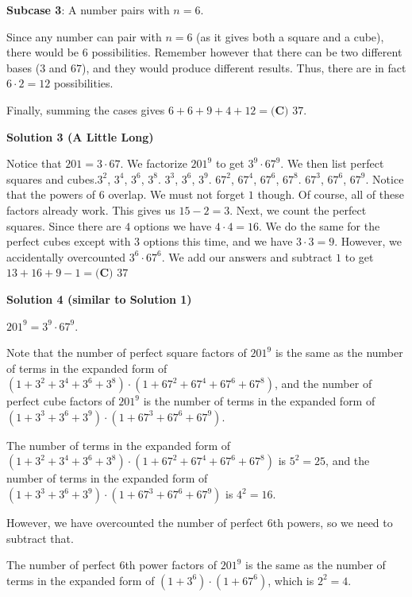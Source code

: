 \begin{enumerate}
 \textbf{Subcase 3}: A number pairs with $n=6$.

 Since any number can pair with $n=6$ (as it gives both a square and a cube), there would be $6$ possibilities. Remember however that there can be two different bases ($3$ and $67$), and they would produce different results. Thus, there are in fact $6 \cdot 2 = 12$ possibilities.

 Finally, summing the cases gives $6+6+9+4+12 = \boxed{\textbf{(C) }37}$.

 



\textbf{Solution 3 (A Little Long)}

Notice that $201=3 \cdot 67$. We factorize $201^9$ to get $3^9 \cdot 67^9$. We then list perfect squares and cubes.$3^2$, $3^4$, $3^6$, $3^8$. $3^3$, $3^6$, $3^9$. $67^2$, $67^4$, $67^6$, $67^8$. $67^3$, $67^6$, $67^9$. Notice that the powers of $6$ overlap. We must not forget $1$ though. Of course, all of these factors already work. This gives us $15-2=3$. Next, we count the perfect squares. Since there are $4$ options we have $4 \cdot 4=16$. We do the same for the perfect cubes except with 3 options this time, and we have $3 \cdot 3=9$. However, we accidentally overcounted $3^6 \cdot 67^6$. We add our answers and subtract $1$ to get $13+16+9-1 = \boxed{\textbf{(C) }37}$




\textbf{Solution 4 (similar to Solution 1)}

$201^9 = 3^9 \cdot 67^9$.

 Note that the number of perfect square factors of $201^9$ is the same as the number of terms in the expanded form of $(1 + 3^2 + 3^4 + 3^6 + 3^8) \cdot (1 + 67^2 + 67^4 + 67^6 + 67^8)$, and the number of perfect cube factors of $201^9$ is the number of terms in the expanded form of $(1 + 3^3 + 3^6 + 3^9) \cdot (1 + 67^3 + 67^6 + 67^9)$.

 The number of terms in the expanded form of $(1 + 3^2 + 3^4 + 3^6 + 3^8) \cdot (1 + 67^2 + 67^4 + 67^6 + 67^8)$ is $5^2 = 25$, and the number of terms in the expanded form of $(1 + 3^3 + 3^6 + 3^9) \cdot (1 + 67^3 + 67^6 + 67^9)$ is $4^2 = 16$.

 However, we have overcounted the number of perfect $6$th powers, so we need to subtract that.

 The number of perfect 6th power factors of $201^9$ is the same as the number of terms in the expanded form of $(1 + 3^6) \cdot (1 + 67^6)$, which is $2^2 = 4$.


\end{enumerate}
